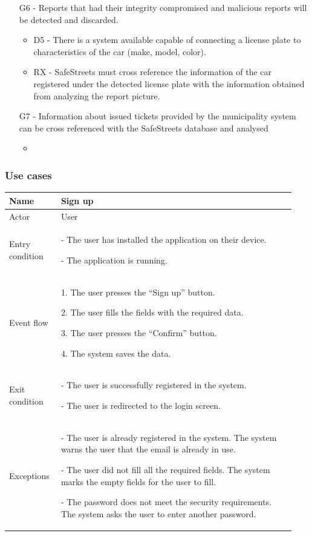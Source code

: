 \begin{itemize}
\item
[G6] - Reports that had their integrity compromised and malicious reports will be detected and discarded.
    \begin{itemize}
    \item
	D5 - There is a system available capable of connecting a license plate to characteristics of the car (make, model, color).
    \item
	RX - SafeStreets must cross reference the information of the car registered under the detected license plate with the information obtained from analyzing the report picture.
    \end{itemize}
\item
[G7] - Information about issued tickets provided by the municipality system can be cross referenced with the SafeStreets database and analysed 
    \begin{itemize}
    \item
    \end{itemize} 
 \end{itemize}

\subsubsection{Use cases}

\begin{table}[H]
\begin{tabular}{|p{0.17\linewidth}|p{0.77\linewidth}|}
\hline
Name            & Sign up
\\ \hline

Actor           & User
\\ \hline

Entry condition &
- The user has installed the application on their device.

- The application is running.
\\ \hline
Event flow      & 
    1. The user presses the “Sign up” button.

    2. The user fills the fields with the required data.

    3. The user presses the “Confirm” button.

    4. The system saves the data.
\\ \hline
Exit condition  & 
 - The user is successfully registered in the system.

 - The user is redirected to the login screen.
\\ \hline
Exceptions      &
    - The user is already registered in the system. The system warns the user that the email is already in use. 

    - The user did not fill all the required fields. The system marks the empty fields for the user to fill.

    - The password does not meet the security requirements. The system asks the user to enter another password.
\\ \hline
\end{tabular}
\end{table}

